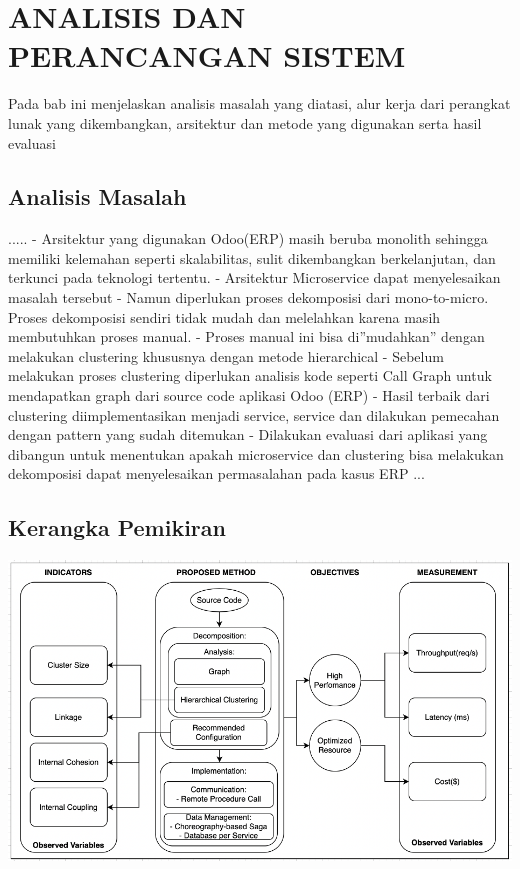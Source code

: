 \chapter{ANALISIS DAN PERANCANGAN SISTEM}
\vspace{4.5pt}

Pada bab ini menjelaskan analisis masalah yang diatasi, alur kerja dari perangkat lunak yang dikembangkan, arsitektur dan metode yang digunakan serta hasil evaluasi

\section{Analisis Masalah}
..... - Arsitektur yang digunakan Odoo(ERP) masih beruba monolith sehingga memiliki kelemahan seperti skalabilitas, sulit dikembangkan berkelanjutan, dan terkunci pada teknologi tertentu.
- Arsitektur Microservice dapat menyelesaikan masalah tersebut
- Namun diperlukan proses dekomposisi dari mono-to-micro. Proses dekomposisi sendiri  tidak mudah dan melelahkan karena masih membutuhkan proses manual. 
- Proses manual ini bisa di”mudahkan” dengan melakukan clustering khususnya dengan metode hierarchical 
- Sebelum melakukan proses clustering diperlukan analisis kode seperti Call Graph untuk mendapatkan graph dari source code aplikasi Odoo (ERP)
- Hasil terbaik dari clustering diimplementasikan menjadi service, service dan dilakukan pemecahan dengan pattern yang sudah ditemukan
- Dilakukan evaluasi dari aplikasi yang dibangun untuk menentukan apakah microservice dan clustering bisa melakukan dekomposisi dapat menyelesaikan permasalahan pada kasus ERP ...\\

\section{Kerangka Pemikiran}
\begin{center}
	\includegraphics[width=14cm]{img/KerangkaPemikiran.png}
	\label{fig:asd}
\end{center}

